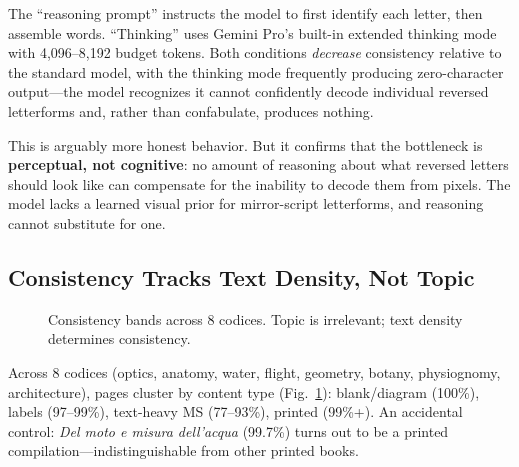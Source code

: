 \documentclass[10pt,twocolumn]{article}
\begin{document}
The ``reasoning prompt'' instructs the model to first identify each letter, then assemble words. ``Thinking'' uses Gemini Pro's built-in extended thinking mode with 4,096--8,192 budget tokens. Both conditions \emph{decrease} consistency relative to the standard model, with the thinking mode frequently producing zero-character output---the model recognizes it cannot confidently decode individual reversed letterforms and, rather than confabulate, produces nothing.

This is arguably more honest behavior. But it confirms that the bottleneck is \textbf{perceptual, not cognitive}: no amount of reasoning about what reversed letters should look like can compensate for the inability to decode them from pixels. The model lacks a learned visual prior for mirror-script letterforms, and reasoning cannot substitute for one.

\subsection{Consistency Tracks Text Density, Not Topic}

\begin{figure}[H]
\centering
{}
\caption{Consistency bands across 8 codices. Topic is irrelevant; text density determines consistency.}
\label{fig:bands}
\end{figure}

Across 8 codices (optics, anatomy, water, flight, geometry, botany, physiognomy, architecture), pages cluster by content type (Fig.~\ref{fig:bands}): blank/diagram (100\%), labels (97--99\%), text-heavy MS (77--93\%), printed (99\%+). An accidental control: \emph{Del moto e misura dell'acqua} (99.7\%) turns out to be a printed compilation---indistinguishable from other printed books.
\end{document}
